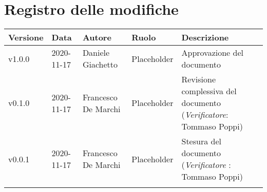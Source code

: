 \section*{\hfil Registro delle modifiche \hfil}
{
	\newlength{\freewidth}
	\setlength{\freewidth}{\dimexpr\textwidth-10\tabcolsep}
	\renewcommand{\arraystretch}{1.5}
	\centering
	\setlength{\aboverulesep}{0pt}
	\setlength{\belowrulesep}{0pt}
	\begin{longtable}{C{.131777\freewidth} C{.134036\freewidth} C{.263554\freewidth} C{.188254\freewidth} C{.282379\freewidth}}
		\toprule 
		\textbf{Versione} & \textbf{Data} & \textbf{Autore} & \textbf{Ruolo} & \textbf{Descrizione}\\
		\toprule
		\endhead
		
		v1.0.0 & 2020-11-17 &Daniele Giachetto & Placeholder & Approvazione del documento \\  
		v0.1.0 & 2020-11-17 & Francesco De Marchi & Placeholder & Revisione complessiva del documento (\textit{Verificatore}: Tommaso Poppi) \\ 
		v0.0.1 & 2020-11-17 & Francesco De Marchi & Placeholder & Stesura del documento (\textit{Verificatore} : Tommaso Poppi) \\
		
		
		\bottomrule
		\hiderowcolors
	\end{longtable}
}
